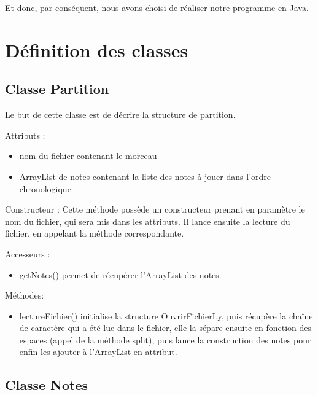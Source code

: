 \documentclass{EPUProjetPeiP}
\begin{document}
Et donc, par conséquent, nous avons choisi de réaliser notre programme en Java.

\section{Définition des classes}

\subsection{Classe Partition}

Le but de cette classe est de décrire la structure de partition.

Attributs :
\begin{itemize}
\item nom du fichier contenant le morceau
\item ArrayList de notes contenant la liste des notes à jouer dans l'ordre chronologique
\end{itemize}

Constructeur :
Cette méthode possède un constructeur prenant en paramètre le nom du fichier, qui sera mis dans les attributs.
Il lance ensuite la lecture du fichier, en appelant la méthode correspondante.

Accesseurs :
\begin{itemize}
\item getNotes() permet de récupérer l'ArrayList des notes.
\end{itemize}


Méthodes:
\begin{itemize}
\item lectureFichier() initialise la structure OuvrirFichierLy, puis récupère la chaîne de caractère qui a été lue dans le fichier, elle la sépare ensuite en fonction des espaces (appel de la méthode split), puis lance la construction des notes pour enfin les ajouter à l'ArrayList en attribut.
\end{itemize}

\subsection{Classe Notes}
\end{document}
